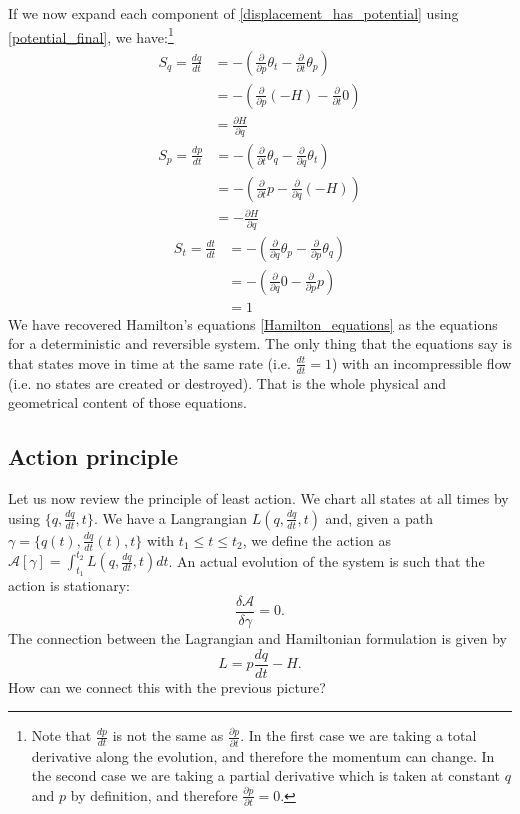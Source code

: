 \documentclass[10pt,twocolumn, nofootinbib]{revtex4-2}
\begin{document}
If we now expand each component of \ref{displacement_has_potential} using \ref{potential_final}, we have:\footnote{Note that $\frac{dp}{dt}$ is not the same as $\frac{\partial p}{\partial t}$. In the first case we are taking a total derivative along the evolution, and therefore the momentum can change. In the second case we are taking a partial derivative which is taken at constant $q$ and $p$ by definition, and therefore $\frac{\partial p}{\partial t}=0$.}
\begin{align*}
	S_q = \frac{dq}{dt}
	&= - \left( \frac{\partial}{\partial p} \theta_t - \frac{\partial}{\partial t} \theta_p \right) \\
	&= - \left( \frac{\partial}{\partial p} (-H) - \frac{\partial}{\partial t} 0 \right) \\
	& = \frac{\partial H}{\partial q}
\end{align*}
\begin{align*}
	S_p = \frac{dp}{dt}
	&= - \left( \frac{\partial}{\partial t} \theta_q - \frac{\partial}{\partial q} \theta_t \right) \\
	&= - \left( \frac{\partial}{\partial t} p - \frac{\partial}{\partial q} (-H) \right) \\
	& = - \frac{\partial H}{\partial q}
\end{align*}
\begin{align*}
	S_t = \frac{dt}{dt}
	&= - \left( \frac{\partial}{\partial q} \theta_p - \frac{\partial}{\partial p} \theta_q \right) \\
	&= - \left( \frac{\partial}{\partial q} 0 - \frac{\partial}{\partial p} p \right) \\
	& = 1
\end{align*}
We have recovered Hamilton's equations \ref{Hamilton_equations} as the equations for a deterministic and reversible system. The only thing that the equations say is that states move in time at the same rate (i.e. $\frac{dt}{dt} = 1$) with an incompressible flow (i.e. no states are created or destroyed). That is the whole physical and geometrical content of those equations.

\subsection{Action principle}

Let us now review the principle of least action. We chart all states at all times by using $\{q, \frac{dq}{dt}, t\}$. We have a Langrangian $L(q, \frac{dq}{dt}, t)$ and, given a path $\gamma = \{q(t), \frac{dq}{dt}(t), t\}$ with $t_1 \leq t \leq t_2$, we define the action as $\mathcal{A}[\gamma] = \int_{t_1}^{t_2} L(q, \frac{dq}{dt}, t) dt$. An actual evolution of the system is such that the action is stationary:
\begin{equation}
	\frac{\delta \mathcal{A}}{\delta \gamma} = 0.
\end{equation}
The connection between the Lagrangian and Hamiltonian formulation is given by
\begin{equation}
	L = p \frac{dq}{dt} - H.
\end{equation}
How can we connect this with the previous picture?
\end{document}
